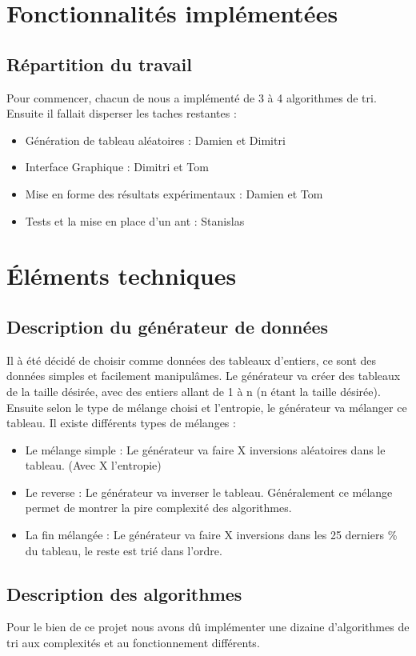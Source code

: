 \documentclass{article}
\begin{document}
\section{Fonctionnalités implémentées}

\subsection{Répartition du travail}

Pour commencer, chacun de nous a implémenté de 3 à 4 algorithmes de tri.
Ensuite il fallait disperser les taches restantes : 
\begin{itemize}
    \item Génération de tableau aléatoires : Damien et Dimitri 
    \item Interface Graphique : Dimitri et Tom
    \item Mise en forme des résultats expérimentaux : Damien et Tom 
    \item Tests et la mise en place d'un ant : Stanislas
\end{itemize}

\section{Éléments techniques}

\subsection{Description du générateur de données}
Il à été décidé de choisir comme données des tableaux d'entiers, ce sont des données simples et facilement manipulâmes. Le générateur va créer des tableaux de la taille désirée, avec des entiers allant de 1 à n (n étant la taille désirée). Ensuite selon le type de mélange choisi et l'entropie, le générateur va mélanger ce tableau. Il existe différents types de mélanges : 
\begin{itemize}
    \item Le mélange simple : Le générateur va faire X inversions aléatoires dans le tableau. (Avec X l'entropie)
    \item Le reverse : Le générateur va inverser le tableau. Généralement ce mélange permet de montrer la pire complexité des algorithmes.
    \item La fin mélangée : Le générateur va faire X inversions dans les 25 derniers \% du tableau, le reste est trié dans l'ordre.
\end{itemize}
\subsection{Description des algorithmes}
Pour le bien de ce projet nous avons dû implémenter une dizaine d'algorithmes de tri aux complexités et au fonctionnement différents.
\end{document}
